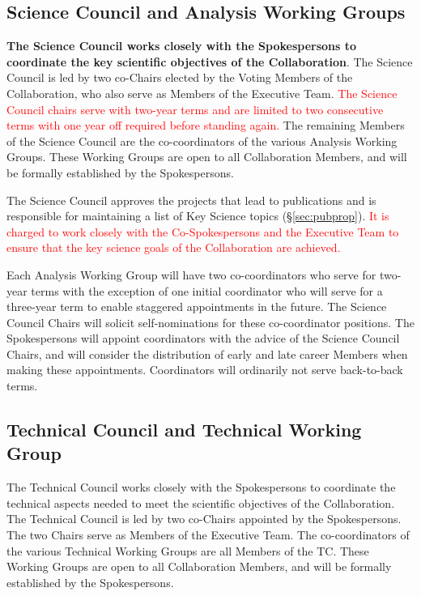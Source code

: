 \documentclass[12pt]{article}
\newcommand{\exec}{{Executive Team}}
\begin{document}
\subsection{Science Council and Analysis Working Groups}
\label{sec:SC}

\textbf{The Science Council works closely with the Spokespersons to coordinate the key scientific objectives of the Collaboration}.  The Science Council is led by two co-Chairs elected by the Voting Members of the Collaboration, who also serve as Members of the \exec.   \textcolor{red}{The Science Council chairs serve with two-year terms and are limited to two consecutive terms with one year off required before standing again.}
The remaining Members of the Science Council are the co-coordinators of the various Analysis Working Groups. These Working Groups are open to all Collaboration Members, and will be formally established by the Spokespersons.  

The Science Council approves the projects that lead to publications and is responsible for maintaining a list of Key Science topics  (\S\ref{sec:pubprop}). \textcolor{red}{It is charged to work closely with the Co-Spokespersons and the Executive Team to ensure that the key science goals of the Collaboration are achieved.} 

Each Analysis Working Group will have two co-coordinators who  serve for two-year terms with the exception of one initial coordinator who will serve for a three-year term to enable staggered appointments in the future.  The Science Council Chairs will solicit self-nominations for these co-coordinator positions. The Spokespersons will appoint coordinators with the advice of the Science Council Chairs, and will consider the distribution of early and late career Members when making these appointments. Coordinators will ordinarily not serve back-to-back terms.


\subsection{Technical Council and Technical Working Group}
The Technical Council works closely with the Spokespersons to coordinate the technical aspects needed to meet the scientific objectives of the Collaboration.  The Technical Council is led by two co-Chairs appointed by the Spokespersons.  The two Chairs serve as Members of the \exec.   The co-coordinators of the various Technical Working Groups are all Members of the TC.   These Working Groups are open to all Collaboration Members, and will be formally established by the Spokespersons.   
\end{document}
